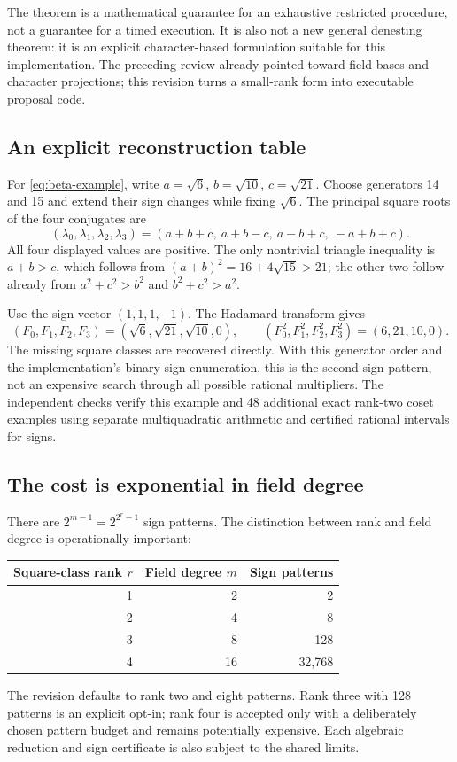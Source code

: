 \documentclass[11pt,a4paper]{article}
\theoremstyle{definition}\newtheorem{definition}[proposition]{Definition}
\theoremstyle{remark}\newtheorem{remark}[proposition]{Remark}
\begin{document}
The theorem is a mathematical guarantee for an exhaustive restricted procedure,
not a guarantee for a timed execution. It is also not a new general denesting
theorem: it is an explicit character-based formulation suitable for this
implementation. The preceding review already pointed toward field bases and
character projections; this revision turns a small-rank form into executable
proposal code.\cite{prior}

\subsection{An explicit reconstruction table}
For \eqref{eq:beta-example}, write $a=\sqrt6$, $b=\sqrt{10}$, $c=\sqrt{21}$.
Choose generators 14 and 15 and extend their sign changes while fixing
$\sqrt6$. The principal square roots of the four conjugates are
\begin{equation}
 (\lambda_0,\lambda_1,\lambda_2,\lambda_3)
 =(a+b+c,\ a+b-c,\ a-b+c,\ -a+b+c).
\end{equation}
All four displayed values are positive. The only nontrivial triangle inequality
is $a+b>c$, which follows from $(a+b)^2=16+4\sqrt{15}>21$; the other two follow
already from $a^2+c^2>b^2$ and $b^2+c^2>a^2$.

Use the sign vector $(1,1,1,-1)$. The Hadamard transform gives
\begin{equation}
 (F_0,F_1,F_2,F_3)=(\sqrt6,\sqrt{21},\sqrt{10},0),\qquad
 (F_0^2,F_1^2,F_2^2,F_3^2)=(6,21,10,0).
\end{equation}
The missing square classes are recovered directly. With this generator order
and the implementation's binary sign enumeration, this is the second sign
pattern, not an expensive search through all possible rational multipliers.
The independent checks verify this example and 48 additional exact rank-two
coset examples using separate multiquadratic arithmetic and certified rational
intervals for signs.

\subsection{The cost is exponential in field degree}
There are $2^{m-1}=2^{2^r-1}$ sign patterns. The distinction between rank and
field degree is operationally important:
\begin{center}
\begin{tabular}{@{}rrr@{}}\toprule
Square-class rank $r$ & Field degree $m$ & Sign patterns\\\midrule
1 & 2 & 2\\2 & 4 & 8\\3 & 8 & 128\\4 & 16 & 32,768\\\bottomrule
\end{tabular}
\end{center}
The revision defaults to rank two and eight patterns. Rank three with 128
patterns is an explicit opt-in; rank four is accepted only with a deliberately
chosen pattern budget and remains potentially expensive. Each algebraic
reduction and sign certificate is also subject to the shared limits.
\end{document}
